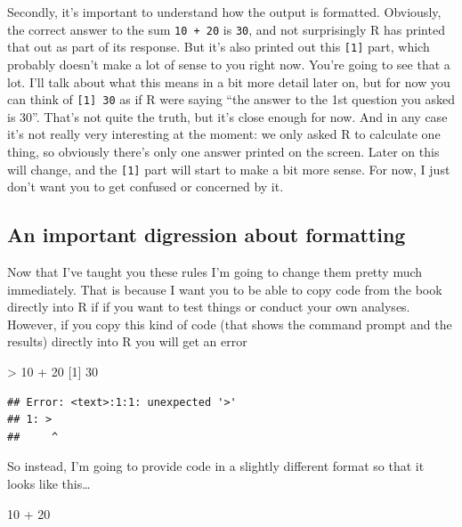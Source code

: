 \documentclass[
]{book}
\newenvironment{Shaded}{\begin{snugshade}}{\end{snugshade}}
\newcommand{\DecValTok}[1]{\textcolor[rgb]{0.00,0.00,0.81}{#1}}
\newcommand{\NormalTok}[1]{#1}
\newcommand{\SpecialCharTok}[1]{\textcolor[rgb]{0.00,0.00,0.00}{#1}}
\begin{document}
Secondly, it's important to understand how the output is formatted. Obviously, the correct answer to the sum \texttt{10\ +\ 20} is \texttt{30}, and not surprisingly R has printed that out as part of its response. But it's also printed out this \texttt{{[}1{]}} part, which probably doesn't make a lot of sense to you right now. You're going to see that a lot. I'll talk about what this means in a bit more detail later on, but for now you can think of \texttt{{[}1{]}\ 30} as if R were saying ``the answer to the 1st question you asked is 30''. That's not quite the truth, but it's close enough for now. And in any case it's not really very interesting at the moment: we only asked R to calculate one thing, so obviously there's only one answer printed on the screen. Later on this will change, and the \texttt{{[}1{]}} part will start to make a bit more sense. For now, I just don't want you to get confused or concerned by it.

\hypertarget{an-important-digression-about-formatting}{%
\subsection{An important digression about formatting}\label{an-important-digression-about-formatting}}

Now that I've taught you these rules I'm going to change them pretty much immediately. That is because I want you to be able to copy code from the book directly into R if if you want to test things or conduct your own analyses. However, if you copy this kind of code (that shows the command prompt and the results) directly into R you will get an error

\begin{Shaded}
\begin{Highlighting}[]
\SpecialCharTok{\textgreater{}} \DecValTok{10} \SpecialCharTok{+} \DecValTok{20}
\NormalTok{[}\DecValTok{1}\NormalTok{] }\DecValTok{30}
\end{Highlighting}
\end{Shaded}

\begin{verbatim}
## Error: <text>:1:1: unexpected '>'
## 1: >
##     ^
\end{verbatim}

So instead, I'm going to provide code in a slightly different format so that it looks like this\ldots{}

\begin{Shaded}
\begin{Highlighting}[]
\DecValTok{10} \SpecialCharTok{+} \DecValTok{20}
\end{Highlighting}
\end{Shaded}
\end{document}
